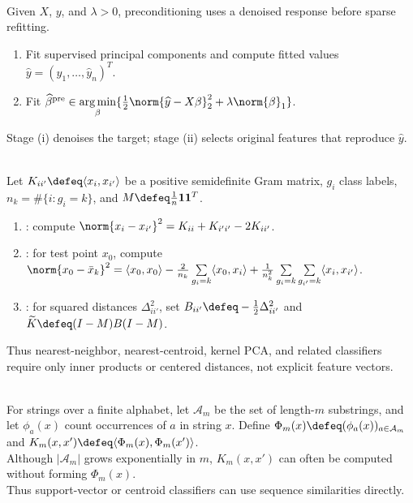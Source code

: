 \begin{method} \label{meth:sl-preconditioned-lasso} \\
Given $X$, $y$, and $\lambda>0$, preconditioning uses a denoised response before sparse refitting.
\begin{enumerate}[label=(\roman*)]
\setlength{\itemsep}{0pt}
\item Fit supervised principal components and compute fitted values $\widehat{y}=(\widehat{y}_1,\ldots,\widehat{y}_n)^T$.
\item Fit $\widehat{\beta}^{\mathrm{pre}}\in\operatorname*{arg\,min}\limits_{\beta}\{\frac{1}{2}\norm{\widehat{y}-X\beta}_2^2+\lambda\norm{\beta}_1\}$.
\end{enumerate}
Stage (i) denoises the target; stage (ii) selects original features that reproduce $\widehat{y}$.
\end{method}

\begin{method} \label{meth:sl-inner-product-and-distance-only-classifiers} \\
Let $K_{ii'}\defeq\langle x_i,x_{i'}\rangle$ be a positive semidefinite Gram matrix, $g_i$ class labels, $n_k=\#\{i:g_i=k\}$, and $M\defeq\frac{1}{n}\mathbf{1}\mathbf{1}^T$.
\begin{enumerate}[label=(\roman*)]
\setlength{\itemsep}{0pt}
\item {}: compute $\norm{x_i-x_{i'}}^2=K_{ii}+K_{i'i'}-2K_{ii'}$.
\item {}: for test point $x_0$, compute $\norm{x_0-\bar{x}_k}^2=\langle x_0,x_0\rangle-\frac{2}{n_k}\sum\limits_{g_i=k}\langle x_0,x_i\rangle+\frac{1}{n_k^2}\sum\limits_{g_i=k}\sum\limits_{g_{i'}=k}\langle x_i,x_{i'}\rangle$.
\item {}: for squared distances $\Delta_{ii'}^2$, set $B_{ii'}\defeq-\frac{1}{2}\Delta_{ii'}^2$ and $\widetilde{K}\defeq(I-M)B(I-M)$.
\end{enumerate}
Thus nearest-neighbor, nearest-centroid, kernel PCA, and related classifiers require only inner products or centered distances, not explicit feature vectors.
\end{method}

\begin{example} \label{ex:sl-string-kernel-high-dimensional-features} \\
For strings over a finite alphabet, let $\mathcal{A}_m$ be the set of length-$m$ substrings, and let $\phi_a(x)$ count occurrences of $a$ in string $x$. Define $\Phi_m(x)\defeq(\phi_a(x))_{a\in\mathcal{A}_m}$ and $K_m(x,x')\defeq\langle\Phi_m(x),\Phi_m(x')\rangle$.\\
Although $|\mathcal{A}_m|$ grows exponentially in $m$, $K_m(x,x')$ can often be computed without forming $\Phi_m(x)$.\\
Thus support-vector or centroid classifiers can use sequence similarities directly.
\end{example}
